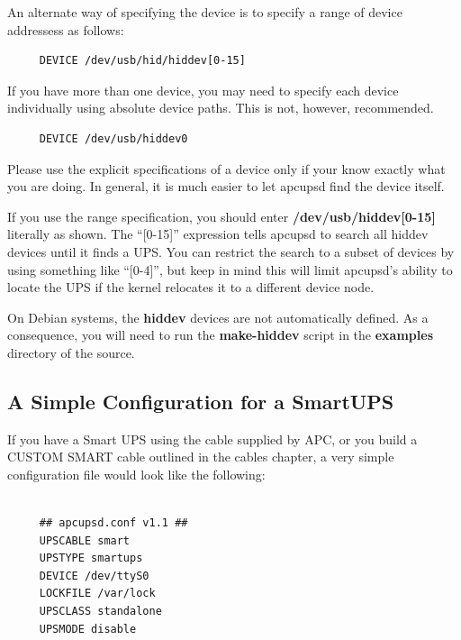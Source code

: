 An alternate way of specifying the device is to specify a range of device
addressess as follows: 

\footnotesize
\begin{verbatim}
     DEVICE /dev/usb/hid/hiddev[0-15]
\end{verbatim}
\normalsize

If you have more than one device, you may need to specify each device
individually using absolute device paths. This is not, however, recommended. 

\footnotesize
\begin{verbatim}
     DEVICE /dev/usb/hiddev0
\end{verbatim}
\normalsize

Please use the explicit specifications of a device only if your know exactly
what you are doing. In general, it is much easier to let apcupsd find the
device itself.  

If you use the range specification, you should enter {\bf
/dev/usb/hiddev[0-15]} literally as shown.  The ``[0-15]'' expression tells
apcupsd to search all hiddev devices until it finds a UPS. You can restrict
the search to a subset of devices by using something like ``[0-4]'', but keep
in mind this will limit apcupsd's ability to locate the UPS if the kernel
relocates it to a different device node.  

On Debian systems, the {\bf hiddev} devices are not automatically defined. As
a consequence, you will need to run the {\bf make-hiddev} script in the {\bf
examples} directory of the source. 

\label{A-Simple-Configuration-for-a-SmartUPS}

\subsection*{A Simple Configuration for a SmartUPS}

\label{index-Configuration_002c-SmartUPS-68}
\label{index-SmartUPS-configuration-69}
\label{index-Example_002c-SmartUPS-conf-70}
If you have a Smart UPS using the cable supplied by APC, or you build a CUSTOM
SMART cable outlined in the cables chapter, a very simple configuration file
would look like the following: 

\footnotesize
\begin{verbatim}
     
     ## apcupsd.conf v1.1 ##
     UPSCABLE smart
     UPSTYPE smartups
     DEVICE /dev/ttyS0
     LOCKFILE /var/lock
     UPSCLASS standalone
     UPSMODE disable
\end{verbatim}
\normalsize

